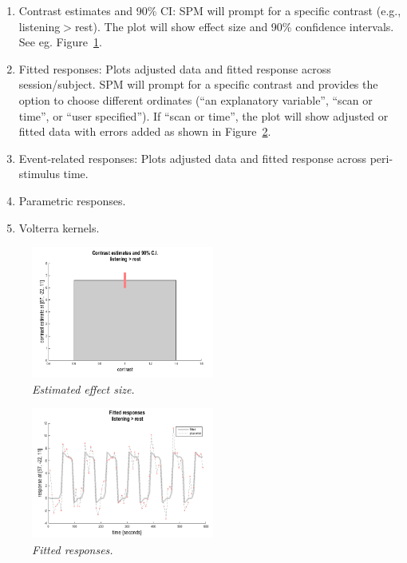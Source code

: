 \begin{enumerate}
\item Contrast estimates and 90\% CI: SPM will prompt for a specific contrast (e.g., listening$>$rest). The plot will show effect size and 90\% confidence intervals. See eg. Figure~\ref{aud_contrast}.
\item Fitted responses: Plots adjusted data and fitted response across session/subject. SPM will prompt for a specific contrast and provides the option to choose different ordinates (``an explanatory variable'', ``scan or time'', or ``user specified''). If ``scan or time'', the plot will show adjusted or fitted data with errors added as shown in Figure~\ref{aud_fitted}.
\item Event-related responses: Plots adjusted data and fitted response across peri-stimulus time.
\item Parametric responses.
\item Volterra kernels.
\end{enumerate}

\begin{figure}
\begin{center}
\includegraphics[width=60mm]{auditory/contrast}
\caption{\em Estimated effect size. \label{aud_contrast}}
\end{center}
\end{figure}

\begin{figure}
\begin{center}
\includegraphics[width=60mm]{auditory/fitted}
\caption{\em Fitted responses. \label{aud_fitted}}
\end{center}
\end{figure}

